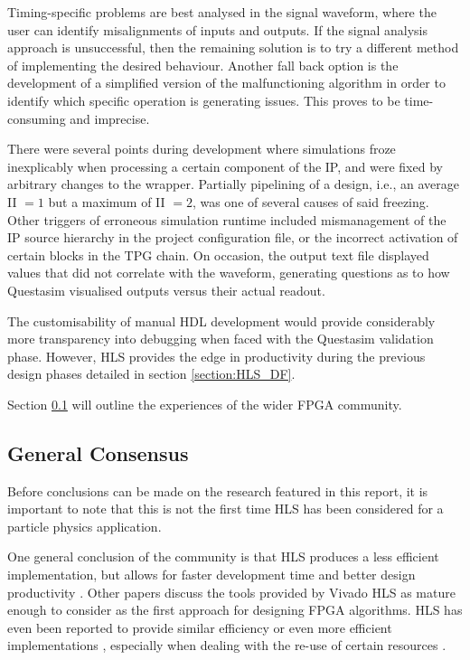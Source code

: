 \documentclass[10pt]{article}
\begin{document}
Timing-specific problems are best analysed in the signal waveform, where the user can identify misalignments of inputs and outputs. If the signal analysis approach is unsuccessful, then the remaining solution is to try a different method of implementing the desired behaviour. Another fall back option is the development of a simplified version of the malfunctioning algorithm in order to identify which specific operation is generating issues. This proves to be time-consuming and imprecise.

There were several points during development where simulations froze inexplicably when processing a certain component of the IP, and were fixed by arbitrary changes to the wrapper. Partially pipelining of a design, i.e., an average II $= 1$ but a maximum of II $= 2$, was one of several causes of said freezing. Other triggers of erroneous simulation runtime included mismanagement of the IP source hierarchy in the project configuration file, or the incorrect activation of certain blocks in the TPG chain. On occasion, the output text file displayed values that did not correlate with the waveform, generating questions as to how Questasim visualised outputs versus their actual readout.

The customisability of manual HDL development would provide considerably more transparency into debugging when faced with the Questasim validation phase. However, HLS provides the edge in productivity during the previous design phases detailed in section \ref{section:HLS_DF}.

Section \ref{Discussion} will outline the experiences of the wider FPGA community.

\subsection{General Consensus} \label{Discussion}

Before conclusions can be made on the research featured in this report, it is important to note that this is not the first time HLS has been considered for a particle physics application.

One general conclusion of the community is that HLS produces a less efficient implementation, but allows for faster development time and better design productivity \cite{marc2018two, pelcat2016design, 8259883}. Other papers discuss the tools provided by Vivado HLS as mature enough to consider as the first approach for designing FPGA algorithms. HLS has even been reported to provide similar efficiency or even more efficient implementations \cite{8603064, duarte2018fast}, especially when dealing with the re-use of certain resources \cite{6699478}.
\end{document}
